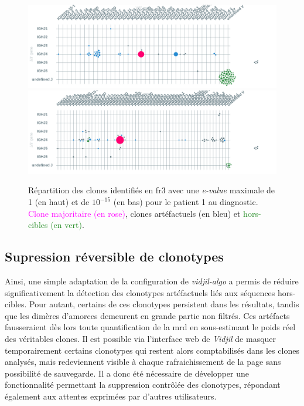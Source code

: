 \begin{figure}[H]
    \centering
    \includegraphics[width=1\textwidth]{images/diah_fr3_e1.png}
    \vspace{0.5cm}
    \includegraphics[width=1\textwidth]{images/diag_fr3_e-15.png}
    \caption{
        Répartition des clones identifiés en \gls{fr}3 avec une \textit{e-value} maximale de 1 (en haut) 
        et de $10^{-15}$ (en bas) pour le patient 1 au diagnostic. \textcolor{Magenta}{Clone majoritaire (en rose)}, 
        \textcolor{ProcessBlue}{clones artéfactuels (en bleu)} et \textcolor{ForestGreen}{hors-cibles (en vert)}.
    }
    \label{fig:fr3-evalue}
\end{figure}

\subsection{Supression réversible de clonotypes}

Ainsi, une simple adaptation de la configuration de \textit{vidjil-algo} a permis de réduire significativement la détection des clonotypes 
artéfactuels liés aux séquences hors-cibles. Pour autant, certains de ces clonotypes persistent dans les résultats, tandis que les dimères 
d'amorces demeurent en grande partie non filtrés. Ces artéfacts fausseraient dès lors toute quantification de la \gls{mrd} en sous-estimant 
le poids réel des véritables clones.
Il est possible via l'interface web de \textit{Vidjil} de masquer temporairement certains 
clonotypes qui restent alors comptabilisés dans les clones analysés, mais redeviennent visible à chaque rafraichissement de la page sans 
possibilité de sauvegarde. Il a donc été nécessaire de développer une fonctionnalité permettant la suppression contrôlée des clonotypes, 
répondant également aux attentes exprimées par d'autres utilisateurs.

